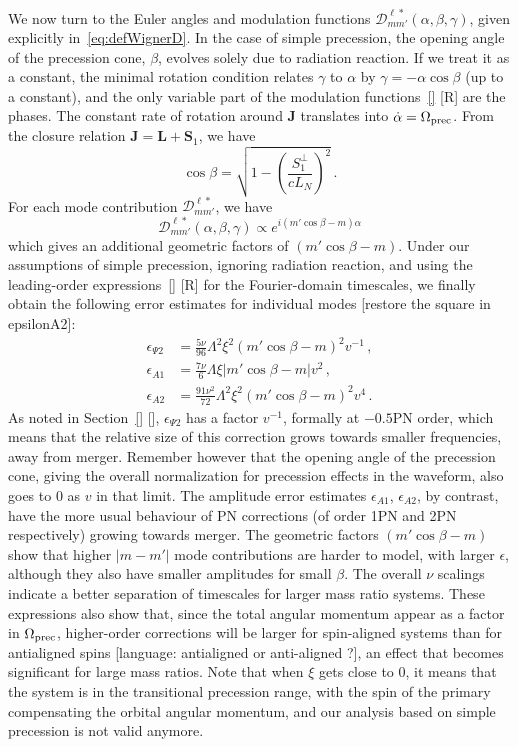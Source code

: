 \documentclass[aps,showpacs,twocolumn,
prd,superscriptaddress,nofootinbib]{revtex4-1}
\newcommand{\be}{\begin{equation}}
\newcommand{\ee}{\end{equation}}
\newcommand\calD{{\mathcal{D}}}
\newcommand{\SM}[1]{{\color{Red} #1}}
\begin{document}
We now turn to the Euler angles and modulation functions $\calD^{\ell *}_{mm'}(\alpha, \beta, \gamma)$, given explicitly in~\eqref{eq:defWignerD}. In the case of simple precession, the opening angle of the precession cone, $\beta$, evolves solely due to radiation reaction. If we treat it as a constant, the minimal rotation condition relates $\gamma$ to $\alpha$ by $\gamma  = -\alpha \cos \beta$ (up to a constant), and the only variable part of the modulation functions~\eqref{} \SM{[R]} are the phases. The constant rate of rotation around $\bm{J}$ translates into $\dot{\alpha} = \Omega_{\rm prec}$. From the closure relation $\bm{J} = \bm{L} + \bm{S}_{1}$, we have
\be\label{eq:betaconst}
	\cos \beta = \sqrt{1 - \left( \frac{S_{1}^{\perp}}{c L_{N}} \right)^{2}}\,.
\ee
For each mode contribution $\calD^{\ell *}_{mm'}$, we have
\be
	\calD^{\ell *}_{mm'} (\alpha, \beta, \gamma) \propto e^{i(m' \cos\beta - m) \alpha}
\ee
which gives an additional geometric factors of $(m' \cos\beta - m)$.
Under our assumptions of simple precession, ignoring radiation reaction, and using the leading-order expressions~\eqref{} \SM{[R]} for the Fourier-domain timescales, we finally obtain the following error estimates for individual modes \SM{[restore the square in epsilonA2]}:
\begin{subequations}
\begin{align}
	\epsilon_{\Psi 2} &= \frac{5\nu}{96} \Lambda^{2} \xi^{2} (m' \cos\beta - m)^{2} v^{-1} \,, \\
	\epsilon_{A 1} &=  \frac{7\nu}{6} \Lambda \xi |m' \cos\beta - m| v^{2} \,, \\
	\epsilon_{A 2} &= \frac{91 \nu^{2}}{72} \Lambda^{2} \xi^{2} (m' \cos\beta - m)^{2} v^{4} \,.
\end{align}
\end{subequations}
As noted in Section~\ref{} \SM{[]}, $\epsilon_{\Psi 2}$ has a factor $v^{-1}$, formally at $-0.5$PN order, which means that the relative size of this correction grows towards smaller frequencies, away from merger. Remember however that the opening angle of the precession cone, giving the overall normalization for precession effects in the waveform, also goes to 0 as $v$ in that limit. The amplitude error estimates $\epsilon_{A1}$, $\epsilon_{A2}$, by contrast, have the more usual behaviour of PN corrections (of order 1PN and 2PN respectively) growing towards merger. The geometric factors $(m' \cos\beta - m)$ show that higher $|m-m'|$ mode contributions are harder to model, with larger $\epsilon$, although they also have smaller amplitudes for small $\beta$. The overall $\nu$ scalings indicate a better separation of timescales for larger mass ratio systems. These expressions also show that, since the total angular momentum appear as a factor in $\Omega_{\rm prec}$, higher-order corrections will be larger for spin-aligned systems than for antialigned spins \SM{[language: antialigned or anti-aligned ?]}, an effect that becomes significant for large mass ratios. Note that when $\xi$ gets close to 0, it means that the system is in the transitional precession range, with the spin of the primary compensating the orbital angular momentum, and our analysis based on simple precession is not valid anymore.
\end{document}
